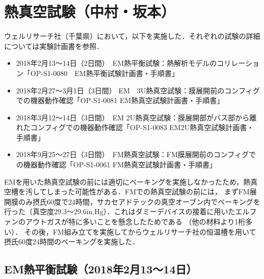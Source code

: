 \section{熱真空試験（中村・坂本）}

ウェルリサーチ社（千葉県）において，以下を実施した．それぞれの試験の詳細については実験計画書を参照．

\begin{itemize}
	\item 2018年2月13～14日（2日間）　EM熱平衡試験：熱解析モデルのコリレーション「OP-S1-0080　EM熱平衡試験計画書・手順書」
	\item 2018年2月27～3月1日（3日間） EM　3U熱真空試験：膜展開前のコンフィグでの機器動作確認「OP-S1-0081 EM熱真空試験計画書・手順書」
	\item 2018年3月12～14日（3日間）　EM 2U熱真空試験：膜展開部がバス部から離れたコンフィグでの機器動作確認「OP-S1-0083 EM2U熱真空試験計画書・手順書」
	\item 2018年9月25～27日（3日間）　FM熱真空試験：FM膜展開前のコンフィグでの機器動作確認「OP-S1-0061 FM熱真空試験計画書・手順書」
\end{itemize}

EMを用いた熱真空試験の前には適切にベーキングを実施しなかったため，熱真空槽を汚してしまった可能性がある．FMでの熱真空試験の前には，
まずFM展開膜のみ摂氏60度で24時間，サカセアドテックの真空オーブン内でベーキングを行った（真空度29.3～29.6in.Hg）．これはダミーデバイスの接着に用いたエルファンのアウトガスが特に多いことを懸念したためである
（他の材料より1桁多い）．
その後，FM組み立てを実施してからウェルリサーチ社の恒温槽を用いて摂氏60度24時間のベーキングを実施した．

\subsection{EM熱平衡試験（2018年2月13～14日）}

